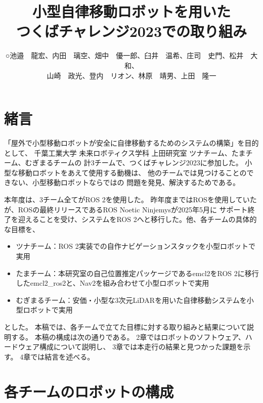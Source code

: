 \documentclass[twocolumn,9pt]{jsproceedings}
\title{小型自律移動ロボットを用いた\\つくばチャレンジ2023での取り組み}
\author{○池邉　龍宏\authorrefmark{2}、内田　璃空\authorrefmark{2}、畑中　優一郎\authorrefmark{1}、臼井　温希\authorrefmark{1}、庄司　史門\authorrefmark{1}、松井　大和\authorrefmark{1}、\\
山崎　政光\authorrefmark{1}、登内　リオン\authorrefmark{1}、林原　靖男\authorrefmark{1}、上田　隆一\authorrefmark{1}}
\affiliation{千葉工業大学 未来ロボティクス学科 ツナチーム/たまチーム/むぎまるチーム}
\begin{document}
\maketitle


\section{緒言}

「屋外で小型移動ロボットが安全に自律移動するためのシステムの構築」を目的として、
千葉工業大学 未来ロボティクス学科 上田研究室 ツナチーム、たまチーム、むぎまるチームの
計3チームで、つくばチャレンジ2023に参加した。
小型な移動ロボットをあえて使用する動機は、
他のチームでは見つけることのできない、小型移動ロボットならではの
問題を発見、解決するためである。


本年度は、3チーム全てがROS 2\cite{ROS 2}を使用した。
昨年度まではROS\cite{ROS}を使用していたが、ROSの最終リリースであるROS Noetic Ninjemysが2025年5月に
サポート終了を迎えることを受け、システムをROS 2へと移行した。他、各チームの具体的な目標を、

\begin{itemize}
  \item ツナチーム：ROS 2実装での自作ナビゲーションスタックを小型ロボットで実用
  \item たまチーム：本研究室の自己位置推定パッケージであるemcl2\cite{emcl2}をROS 2に移行したemcl2\_ros2\cite{emcl2_ros2}と、Nav2を組み合わせて小型ロボットで実用
  \item むぎまるチーム：安価・小型な3次元LiDARを用いた自律移動システムを小型ロボットで実用
\end{itemize}
とした。
本稿では、各チームで立てた目標に対する取り組みと結果について説明する。
本稿の構成は次の通りである。
2章ではロボットのソフトウェア、ハードウェア構成について説明し、
3章では本走行の結果と見つかった課題を示す。
4章では結言を述べる。

\section{各チームのロボットの構成}
\end{document}
